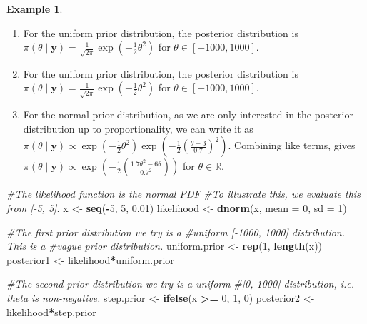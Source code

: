 \documentclass[
]{book}
\newenvironment{Shaded}{\begin{snugshade}}{\end{snugshade}}
\newcommand{\AttributeTok}[1]{\textcolor[rgb]{0.13,0.29,0.53}{#1}}
\newcommand{\CommentTok}[1]{\textcolor[rgb]{0.56,0.35,0.01}{\textit{#1}}}
\newcommand{\DecValTok}[1]{\textcolor[rgb]{0.00,0.00,0.81}{#1}}
\newcommand{\FloatTok}[1]{\textcolor[rgb]{0.00,0.00,0.81}{#1}}
\newcommand{\FunctionTok}[1]{\textcolor[rgb]{0.13,0.29,0.53}{\textbf{#1}}}
\newcommand{\NormalTok}[1]{#1}
\newcommand{\OtherTok}[1]{\textcolor[rgb]{0.56,0.35,0.01}{#1}}
\newcommand{\SpecialCharTok}[1]{\textcolor[rgb]{0.81,0.36,0.00}{\textbf{#1}}}
\providecommand{\tightlist}{%
  \setlength{\itemsep}{0pt}\setlength{\parskip}{0pt}}
\theoremstyle{definition}
\theoremstyle{definition}
\newtheorem{example}{Example}[chapter]
\theoremstyle{definition}
\theoremstyle{definition}
\theoremstyle{remark}
\begin{document}
\begin{example}
\begin{enumerate}
\def\labelenumi{\arabic{enumi}.}
\tightlist
\item
  For the uniform prior distribution, the posterior distribution is \(\pi(\theta \mid \boldsymbol{y}) = \frac{1}{\sqrt{2\pi}}\exp\left(-\frac{1}{2}\theta^2\right)\) for \(\theta \in [-1000, 1000]\).\\
\item
  For the uniform prior distribution, the posterior distribution is \(\pi(\theta \mid \boldsymbol{y}) = \frac{1}{\sqrt{2\pi}}\exp\left(-\frac{1}{2}\theta^2\right)\) for \(\theta \in [-1000, 1000]\).
\item
  For the normal prior distribution, as we are only interested in the posterior distribution up to proportionality, we can write it as \(\pi(\theta \mid \boldsymbol{y}) \propto \exp\left(-\frac{1}{2}\theta^2\right)\exp\left(-\frac{1}{2}\left(\frac{\theta - 3}{0.7}\right)^2\right)\). Combining like terms, gives \(\pi(\theta \mid \boldsymbol{y}) \propto \exp\left(-\frac{1}{2}\left(\frac{1.7\theta^2 - 6\theta}{0.7^2}\right)\right)\) for \(\theta \in \mathbb{R}\).
\end{enumerate}

\begin{Shaded}
\begin{Highlighting}[]
\CommentTok{\#The likelihood function is the normal PDF}
\CommentTok{\#To illustrate this, we evaluate this from [{-}5, 5].}
\NormalTok{x }\OtherTok{\textless{}{-}} \FunctionTok{seq}\NormalTok{(}\SpecialCharTok{{-}}\DecValTok{5}\NormalTok{, }\DecValTok{5}\NormalTok{, }\FloatTok{0.01}\NormalTok{)}
\NormalTok{likelihood }\OtherTok{\textless{}{-}} \FunctionTok{dnorm}\NormalTok{(x, }\AttributeTok{mean =} \DecValTok{0}\NormalTok{, }\AttributeTok{sd =} \DecValTok{1}\NormalTok{)}

\CommentTok{\#The first prior distribution we try is a }
\CommentTok{\#uniform [{-}1000, 1000] distribution. This is a }
\CommentTok{\#vague prior distribution. }
\NormalTok{uniform.prior }\OtherTok{\textless{}{-}} \FunctionTok{rep}\NormalTok{(}\DecValTok{1}\NormalTok{, }\FunctionTok{length}\NormalTok{(x))}
\NormalTok{posterior1 }\OtherTok{\textless{}{-}}\NormalTok{ likelihood}\SpecialCharTok{*}\NormalTok{uniform.prior}


\CommentTok{\#The second prior distribution we try is a uniform }
\CommentTok{\#[0, 1000] distribution, i.e. theta is non{-}negative. }
\NormalTok{step.prior }\OtherTok{\textless{}{-}} \FunctionTok{ifelse}\NormalTok{(x }\SpecialCharTok{\textgreater{}=} \DecValTok{0}\NormalTok{, }\DecValTok{1}\NormalTok{, }\DecValTok{0}\NormalTok{)}
\NormalTok{posterior2 }\OtherTok{\textless{}{-}}\NormalTok{ likelihood}\SpecialCharTok{*}\NormalTok{step.prior}



\end{Highlighting}
\end{Shaded}
\end{example}
\end{document}
